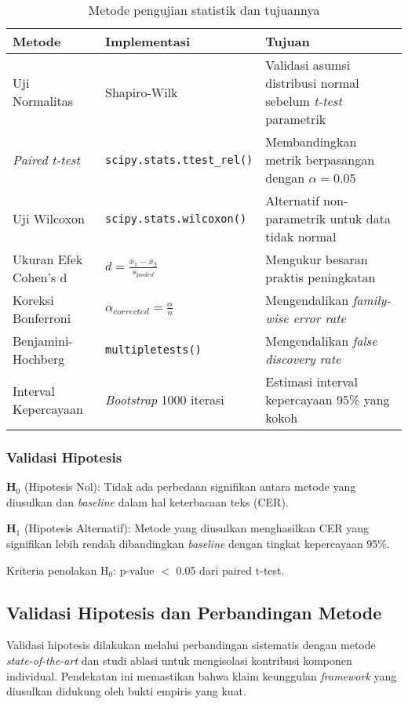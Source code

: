 \documentclass[12pt,a4paper]{article}
\begin{document}
\begin{table}[H]
\centering
\caption{Metode pengujian statistik dan tujuannya}
\label{tab:statistical-tests}
\small
\begin{tabular}{|l|l|p{6.5cm}|}
\hline
\textbf{Metode} & \textbf{Implementasi} & \textbf{Tujuan} \\ \hline
Uji Normalitas & Shapiro-Wilk & Validasi asumsi distribusi normal sebelum \textit{t-test} parametrik \\ \hline
\textit{Paired t-test} & \texttt{scipy.stats.ttest\_rel()} & Membandingkan metrik berpasangan dengan $\alpha = 0.05$ \\ \hline
Uji Wilcoxon & \texttt{scipy.stats.wilcoxon()} & Alternatif non-parametrik untuk data tidak normal \\ \hline
Ukuran Efek Cohen's d & $d = \frac{\bar{x}_1 - \bar{x}_2}{s_{pooled}}$ & Mengukur besaran praktis peningkatan \\ \hline
Koreksi Bonferroni & $\alpha_{corrected} = \frac{\alpha}{n}$ & Mengendalikan \textit{family-wise error rate} \\ \hline
Benjamini-Hochberg & \texttt{multipletests()} & Mengendalikan \textit{false discovery rate} \\ \hline
Interval Kepercayaan & \textit{Bootstrap} 1000 iterasi & Estimasi interval kepercayaan 95\% yang kokoh \\ \hline
\end{tabular}
\end{table}

\subsubsection{Validasi Hipotesis}
\textbf{H$_0$} (Hipotesis Nol): Tidak ada perbedaan signifikan antara metode yang diusulkan dan \textit{baseline} dalam hal keterbacaan teks (CER).

\textbf{H$_1$} (Hipotesis Alternatif): Metode yang diusulkan menghasilkan CER yang signifikan lebih rendah dibandingkan \textit{baseline} dengan tingkat kepercayaan 95\%.

Kriteria penolakan H$_0$: p-value $<$ 0.05 dari paired t-test.

\subsection{Validasi Hipotesis dan Perbandingan Metode}
\label{subsec:validasi-hipotesis}

Validasi hipotesis dilakukan melalui perbandingan sistematis dengan metode \textit{state-of-the-art} dan studi ablasi untuk mengisolasi kontribusi komponen individual. Pendekatan ini memastikan bahwa klaim keunggulan \textit{framework} yang diusulkan didukung oleh bukti empiris yang kuat.
\end{document}
